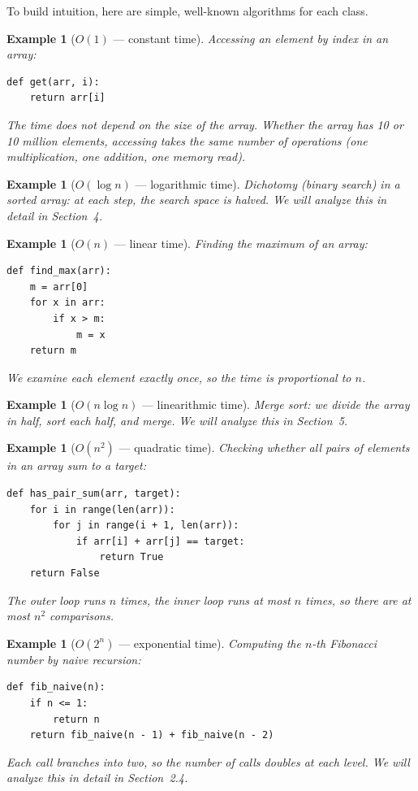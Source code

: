 \documentclass[11pt,a4paper]{article}
\newtheorem{example}[theorem]{Example}
\newcommand{\code}[1]{\texttt{\detokenize{#1}}}
\begin{document}
To build intuition, here are simple, well-known algorithms for each class.

\begin{example}[$O(1)$ --- constant time]
Accessing an element by index in an array:
\begin{lstlisting}
def get(arr, i):
    return arr[i]
\end{lstlisting}
The time does not depend on the size of the array. Whether the array has 10 or 10 million elements, accessing \code{arr[i]} takes the same number of operations (one multiplication, one addition, one memory read).
\end{example}

\begin{example}[$O(\log n)$ --- logarithmic time]
Dichotomy (binary search) in a sorted array: at each step, the search space is halved. We will analyze this in detail in Section~4.
\end{example}

\begin{example}[$O(n)$ --- linear time]
Finding the maximum of an array:
\begin{lstlisting}
def find_max(arr):
    m = arr[0]
    for x in arr:
        if x > m:
            m = x
    return m
\end{lstlisting}
We examine each element exactly once, so the time is proportional to $n$.
\end{example}

\begin{example}[$O(n \log n)$ --- linearithmic time]
Merge sort: we divide the array in half, sort each half, and merge. We will analyze this in Section~5.
\end{example}

\begin{example}[$O(n^2)$ --- quadratic time]
Checking whether all pairs of elements in an array sum to a target:
\begin{lstlisting}
def has_pair_sum(arr, target):
    for i in range(len(arr)):
        for j in range(i + 1, len(arr)):
            if arr[i] + arr[j] == target:
                return True
    return False
\end{lstlisting}
The outer loop runs $n$ times, the inner loop runs at most $n$ times, so there are at most $n^2$ comparisons.
\end{example}

\begin{example}[$O(2^n)$ --- exponential time]
Computing the $n$-th Fibonacci number by naive recursion:
\begin{lstlisting}
def fib_naive(n):
    if n <= 1:
        return n
    return fib_naive(n - 1) + fib_naive(n - 2)
\end{lstlisting}
Each call branches into two, so the number of calls doubles at each level. We will analyze this in detail in Section~2.4.
\end{example}
\end{document}
